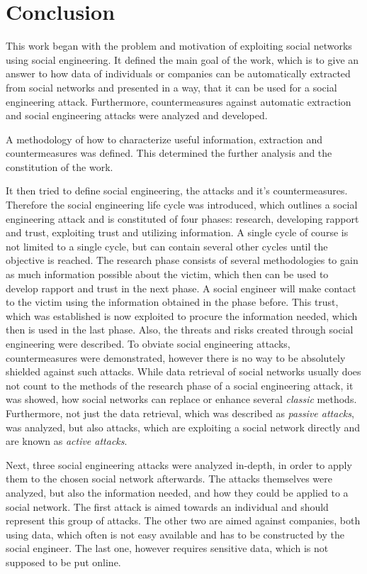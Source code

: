\chapter{Conclusion}
\label{chap:conclusion}

This work began with the problem and motivation of exploiting social networks
using social engineering. It defined the main goal of the work, which is to
give an answer to how data of individuals or companies can be automatically
extracted from social networks and presented in a way, that it can be used for
a social engineering attack. Furthermore, countermeasures against automatic
extraction and social engineering attacks were analyzed and developed.

A methodology of how to characterize useful information, extraction and
countermeasures was defined. This determined the further analysis and the
constitution of the work.

It then tried to define social engineering, the attacks and it's countermeasures.
Therefore the social engineering life cycle was introduced, which outlines a
social engineering attack and is constituted of four phases: research, developing
rapport and trust, exploiting trust and utilizing information. A single cycle
of course is not limited to a single cycle, but can contain several other
cycles until the objective is reached. The research phase consists of several
methodologies to gain as much information possible about the victim, which then
can be used to develop rapport and trust in the next phase. A social engineer
will make contact to the victim using the information obtained in the phase
before. This trust, which was established is now exploited to procure the
information needed, which then is used in the last phase. Also, the threats
and risks created through social engineering were described. To obviate social
engineering attacks, countermeasures were demonstrated, however there is no way
to be absolutely shielded against such attacks. While data retrieval of social
networks usually does not count to the methods of the research phase of a
social engineering attack, it was showed, how social networks can replace or
enhance several \textit{classic} methods. Furthermore, not just the data
retrieval, which was described as \textit{passive attacks}, was analyzed, but
also attacks, which are exploiting a social network directly and are known as
\textit{active attacks}.

Next, three social engineering attacks were analyzed in-depth, in order to
apply them to the chosen social network afterwards. The attacks themselves were
analyzed, but also the information needed, and how they could be applied to a
social network. The first attack is aimed towards an individual and should
represent this group of attacks. The other two are aimed against companies,
both using data, which often is not easy available and has to be constructed by
the social engineer. The last one, however requires sensitive data, which is
not supposed to be put online.

